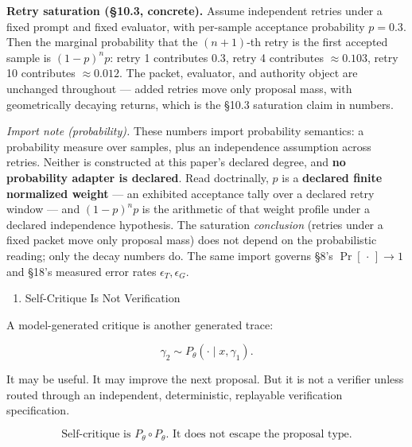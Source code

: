 \documentclass[
  10pt,
]{article}
\providecommand{\tightlist}{%
  \setlength{\itemsep}{0pt}\setlength{\parskip}{0pt}}
\providecommand{\tightlist}{%
  \setlength{\itemsep}{0pt}\setlength{\parskip}{0pt}}
\begin{document}
\textbf{Retry saturation (§10.3, concrete).} Assume independent retries under a fixed prompt and fixed evaluator, with per-sample acceptance probability \protect\hypertarget{math-E0117-0158}{}{\(p = 0.3\)}. Then the marginal probability that the \protect\hypertarget{math-E0118-0159}{}{\((n{+}1)\)}-th retry is the first accepted sample is \protect\hypertarget{math-E0119-0160}{}{\((1-p)^n p\)}: retry 1 contributes \protect\hypertarget{math-E0120-0161}{}{\(0.3\)}, retry 4 contributes \protect\hypertarget{math-E0121-0162}{}{\(\approx 0.103\)}, retry 10 contributes \protect\hypertarget{math-E0122-0163}{}{\(\approx 0.012\)}. The packet, evaluator, and authority object are unchanged throughout --- added retries move only proposal mass, with geometrically decaying returns, which is the §10.3 saturation claim in numbers.

\emph{Import note (probability).} These numbers import probability semantics: a probability measure over samples, plus an independence assumption across retries. Neither is constructed at this paper's declared degree, and \textbf{no probability adapter is declared}. Read doctrinally, \protect\hypertarget{math-E0123-0164}{}{\(p\)} is a \textbf{declared finite normalized weight} --- an exhibited acceptance tally over a declared retry window --- and \protect\hypertarget{math-E0119-0165}{}{\((1-p)^n p\)} is the arithmetic of that weight profile under a declared independence hypothesis. The saturation \emph{conclusion} (retries under a fixed packet move only proposal mass) does not depend on the probabilistic reading; only the decay numbers do. The same import governs §8's \protect\hypertarget{math-E0124-0166}{}{\(\Pr[\,\cdot\,]\to 1\)} and §18's measured error rates \protect\hypertarget{math-E0125-0167}{}{\(\epsilon_T,\epsilon_G\)}.

\begin{enumerate}
\def\labelenumi{\arabic{enumi}.}
\setcounter{enumi}{6}
\tightlist
\item
  Self-Critique Is Not Verification
\end{enumerate}

A model-generated critique is another generated trace:

\protect\hypertarget{math-E0126-0168}{}{\[
\gamma_2\sim P_\theta(\cdot\mid x,\gamma_1).
\]}

It may be useful. It may improve the next proposal. But it is not a verifier unless routed through an independent, deterministic, replayable verification specification.

\protect\hypertarget{math-E0127-0169}{}{\[
\boxed{
\text{Self-critique is }P_\theta\circ P_\theta.\text{ It does not escape the proposal type.}
}
\]}
\end{document}
